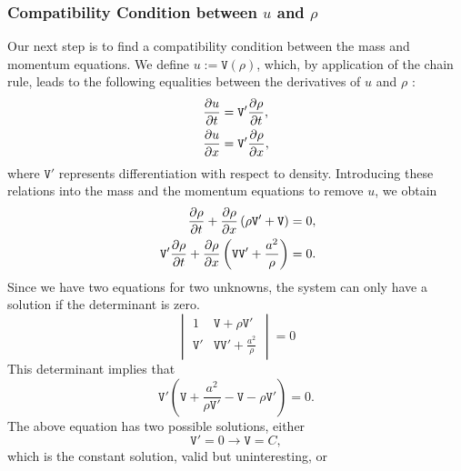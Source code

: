 \documentclass[../../thesis.tex]{subfiles}
\begin{document}
\subsubsection*{Compatibility Condition between $u$ and $\rho$}
Our next step is to find a compatibility condition between the mass and momentum equations.
We define $u:=\mathtt{V}(\rho)$, which, by application of the chain rule, leads to the following equalities between the derivatives of $u$ and $\rho$ :
\begin{subequations}
    \begin{align}
        \pdv{u}{t} &= \mathtt{V}' \pdv{\rho}{t}, \\
        \pdv{u}{x} &= \mathtt{V}' \pdv{\rho}{x},
    \end{align}
\end{subequations}
where $\mathtt{V}'$ represents differentiation with respect to density.
Introducing these relations into the mass and the momentum equations to remove $u$, we obtain
\begin{subequations}
    \begin{align}
            \pdv{\rho}{t} + \pdv{\rho}{x} \left(\rho \mathtt{V}' + \mathtt{V}\right) &= 0, 
            \\ 
            \mathtt{V}' \pdv{\rho}{t} + \pdv{\rho}{x} \left(\mathtt{V} \mathtt{V}' + \frac{a^2}{\rho}\right) &= 0.
    \end{align}
\end{subequations}
Since we have two equations for two unknowns, the system can only have a solution if the determinant is zero.
\begin{equation}
    \begin{vmatrix}
        1 & \mathtt{V} + \rho \mathtt{V}'\\ 
        \mathtt{V}' &  \mathtt{V}\mathtt{V}' + \frac{a^2}{\rho} 
    \end{vmatrix}
    = 0
\end{equation}
This determinant implies that
\begin{equation}
    \mathtt{V}' \left(\mathtt{V} + \frac{a^2}{\rho \mathtt{V}'} - \mathtt{V} - \rho \mathtt{V}'\right) = 0.
\end{equation}
The above equation has two possible solutions, either 
\begin{equation}
    \mathtt{V}'=0 \rightarrow \mathtt{V} = C,
\end{equation} 
which is the constant solution, valid but uninteresting, or 
\end{document}
